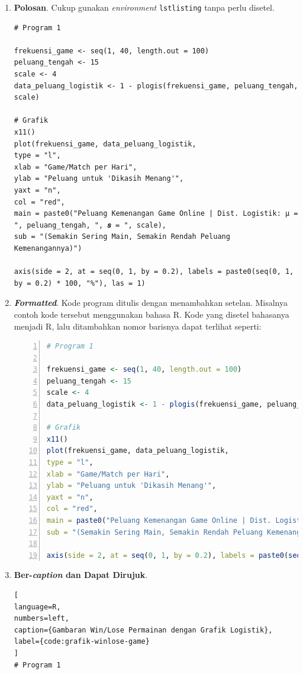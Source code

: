 \begin{enumerate}[]
    \item \textbf{Polosan}. Cukup gunakan \textit{environment} \texttt{lstlisting} tanpa perlu disetel.
    
    \begin{lstlisting}
# Program 1

frekuensi_game <- seq(1, 40, length.out = 100)
peluang_tengah <- 15
scale <- 4
data_peluang_logistik <- 1 - plogis(frekuensi_game, peluang_tengah, scale)

# Grafik
x11()
plot(frekuensi_game, data_peluang_logistik,
type = "l",
xlab = "Game/Match per Hari",
ylab = "Peluang untuk 'Dikasih Menang'",
yaxt = "n",
col = "red",
main = paste0("Peluang Kemenangan Game Online | Dist. Logistik: μ = ", peluang_tengah, ", 𝒔 = ", scale),
sub = "(Semakin Sering Main, Semakin Rendah Peluang Kemenangannya)")

axis(side = 2, at = seq(0, 1, by = 0.2), labels = paste0(seq(0, 1, by = 0.2) * 100, "%"), las = 1)
    \end{lstlisting}
    
    \item \textbf{\textit{Formatted}}. Kode program ditulis dengan menambahkan setelan. Misalnya contoh kode tersebut menggunakan bahasa R. Kode yang disetel bahasanya menjadi R, lalu ditambahkan nomor barisnya dapat terlihat seperti:
    
    \begin{lstlisting}[language=R, numbers=left]
# Program 1

frekuensi_game <- seq(1, 40, length.out = 100)
peluang_tengah <- 15
scale <- 4
data_peluang_logistik <- 1 - plogis(frekuensi_game, peluang_tengah, scale)

# Grafik
x11()
plot(frekuensi_game, data_peluang_logistik,
type = "l",
xlab = "Game/Match per Hari",
ylab = "Peluang untuk 'Dikasih Menang'",
yaxt = "n",
col = "red",
main = paste0("Peluang Kemenangan Game Online | Dist. Logistik: μ = ", peluang_tengah, ", 𝒔 = ", scale),
sub = "(Semakin Sering Main, Semakin Rendah Peluang Kemenangannya)")

axis(side = 2, at = seq(0, 1, by = 0.2), labels = paste0(seq(0, 1, by = 0.2) * 100, "%"), las = 1)
    \end{lstlisting}
    
    \item \textbf{Ber-\textit{caption} dan Dapat Dirujuk}. 
    
    \begin{lstlisting}[
language=R, 
numbers=left,
caption={Gambaran Win/Lose Permainan dengan Grafik Logistik},
label={code:grafik-winlose-game}
]
# Program 1


\end{lstlisting}
\end{enumerate}
